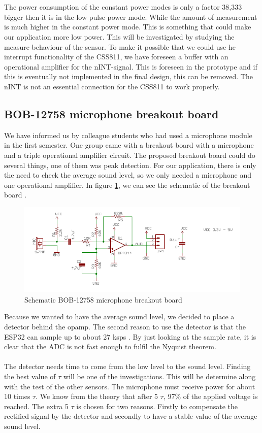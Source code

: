 \documentclass[11pt,a4paper]{article}
\begin{document}
\\ \\
The power consumption of the constant power modes is only a factor 38,333 bigger then it is in the low pulse power mode. While the amount of measurement is much higher in the constant power mode. This is something that could make our application more low power. This will be investigated by studying the measure behaviour of the sensor. To make it possible that we could use he interrupt functionality of the CSS811, we have foreseen a buffer with an operational amplifier for the nINT-signal.  This is foreseen in the prototype and if this is eventually not implemented in the final design, this can be removed. The nINT is not an essential connection for the CSS811 to work properly.


\subsection{BOB-12758 microphone breakout board}
We have informed us by colleague students who had used a microphone module in the first semester. One group came with a breakout board with a microphone and a triple operational amplifier circuit. The proposed breakout board could do several things, one of them was peak detection. For our application, there is only the need to check the average sound level, so we only needed a microphone and one operational amplifier. In figure \ref{fig:BOB-12758}, we can see the schematic of the breakout board \cite{bib:breakout_microphone}.

\begin{figure}[H]
	\centering
	\includegraphics[width=0.8\linewidth]{schematic_microphone_break_out_board.png}
	\caption{Schematic BOB-12758 microphone breakout board \cite{bib:breakout_microphone}}
	\label{fig:BOB-12758}
\end{figure}
Because we wanted to have the average sound level, we decided to place a detector behind the opamp. The second reason to use the detector is that the ESP32 can sample up to about 27 ksps \cite{ADC_speed} . By just looking at the sample rate, it is clear that the ADC is not fast enough to fulfil the Nyquist theorem. 
\\ \\
The detector needs time to come from the low level to the sound level. Finding the best value of $\tau$ will be one of the investigations. This will be determine along with the test of the other sensors. The microphone must receive power for about 10 times $\tau$. We know from the theory that after 5 $\tau$, 97\% of the applied voltage is reached. The extra 5 $\tau$ is chosen for two reasons. Firstly to compensate the rectified signal by the detector and secondly to have a stable value of the average sound level.
\end{document}
